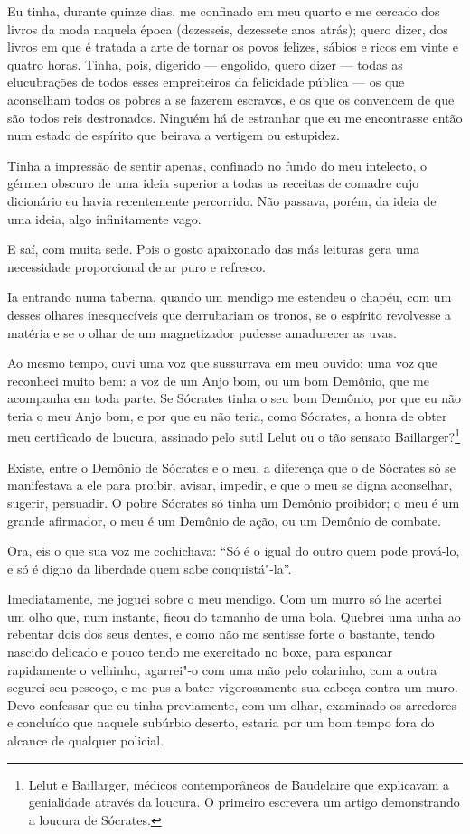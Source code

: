 Eu tinha, durante quinze dias, me confinado em meu quarto e me cercado dos
livros da moda naquela época (dezesseis, dezessete anos atrás); quero dizer, dos
livros em que é tratada a arte de tornar os povos felizes, sábios e
ricos em vinte e quatro horas. Tinha, pois, digerido --- engolido,
quero dizer --- todas as elucubrações de todos esses empreiteiros da
felicidade pública --- os que aconselham todos os pobres a se
fazerem escravos, e os que os convencem de que são todos reis
destronados. Ninguém há de estranhar que eu me encontrasse então num
estado de espírito que beirava a vertigem ou estupidez.

Tinha a impressão de sentir apenas, confinado no fundo do meu intelecto, o
gérmen obscuro de uma ideia superior a todas as receitas de comadre 
cujo dicionário eu havia recentemente percorrido. Não passava, porém, da 
ideia de uma ideia, algo infinitamente vago.

E saí, com muita sede. Pois o gosto apaixonado das más leituras gera
uma necessidade proporcional de ar puro e refresco.

Ia entrando numa taberna, quando um mendigo me estendeu o chapéu, com
um desses olhares inesquecíveis que derrubariam os tronos, se o
espírito revolvesse a matéria e se o olhar de um magnetizador pudesse
amadurecer as uvas.

Ao mesmo tempo, ouvi uma voz que sussurrava em meu ouvido; uma voz que
reconheci muito bem: a voz de um Anjo bom, ou um bom Demônio, que me
acompanha em toda parte. Se Sócrates tinha o seu bom Demônio, por que
eu não teria o meu Anjo bom, e por que eu não teria, como
Sócrates, a honra de obter meu certificado de loucura, assinado pelo
sutil Lelut ou o tão sensato Baillarger?\protect\footnote{  Lelut e Baillarger, 
médicos contemporâneos de Baudelaire que explicavam a 
genialidade através da loucura. O primeiro escrevera um
artigo demonstrando a loucura de Sócrates.}

Existe, entre o Demônio de Sócrates e o meu, a diferença que o de Sócrates
só se manifestava a ele para proibir, avisar, impedir, e que o meu se
digna aconselhar, sugerir, persuadir. O pobre Sócrates só tinha um
Demônio proibidor; o meu é um grande afirmador, o meu é um Demônio de
ação, ou um Demônio de combate.

Ora, eis o que sua voz me cochichava: “Só é o igual do
outro quem pode prová-lo, e só é digno da liberdade quem sabe
conquistá"-la''.

Imediatamente, me joguei sobre o meu mendigo. Com um murro só lhe acertei
um olho que, num instante, ficou do tamanho de uma bola. Quebrei
uma unha ao rebentar dois dos seus dentes, e como não me sentisse forte o
bastante, tendo nascido delicado e pouco tendo me exercitado no boxe,
para espancar rapidamente o velhinho, agarrei"-o com uma mão pelo
colarinho, com a outra segurei seu pescoço, e me pus a bater
vigorosamente sua cabeça contra um muro. Devo confessar que eu tinha
previamente, com um olhar, examinado os arredores e concluído que
naquele subúrbio deserto, estaria por um bom tempo fora do
alcance de qualquer policial.

